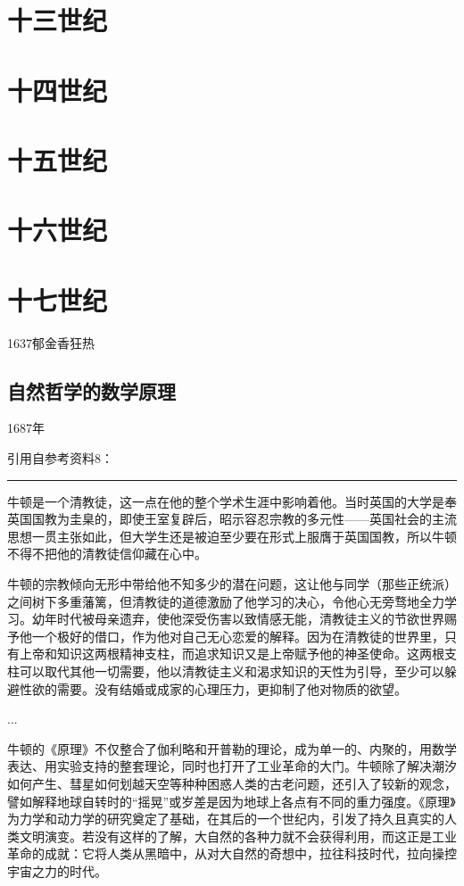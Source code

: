 \documentclass[12pt,oneside]{book}
\newcommand\hr{\par\noindent\hrule}
\begin{document}
\part{十三世纪}

\part{十四世纪}

\part{十五世纪}




\part{十六世纪}

\part{十七世纪}
1637郁金香狂热

\chapter{自然哲学的数学原理}
1687年

引用自参考资料8：
\hr 
牛顿是一个清教徒，这一点在他的整个学术生涯中影响着他。当时英国的大学是奉英国国教为圭臬的，即使王室复辟后，昭示容忍宗教的多元性——英国社会的主流思想一贯主张如此，但大学生还是被迫至少要在形式上服膺于英国国教，所以牛顿不得不把他的清教徒信仰藏在心中。

牛顿的宗教倾向无形中带给他不知多少的潜在问题，这让他与同学（那些正统派）之间树下多重藩篱，但清教徒的道德激励了他学习的决心，令他心无旁骛地全力学习。幼年时代被母亲遗弃，使他深受伤害以致情感无能，清教徒主义的节欲世界赐予他一个极好的借口，作为他对自己无心恋爱的解释。因为在清教徒的世界里，只有上帝和知识这两根精神支柱，而追求知识又是上帝赋予他的神圣使命。这两根支柱可以取代其他一切需要，他以清教徒主义和渴求知识的天性为引导，至少可以躲避性欲的需要。没有结婚或成家的心理压力，更抑制了他对物质的欲望。

...


牛顿的《原理》不仅整合了伽利略和开普勒的理论，成为单一的、内聚的，用数学表达、用实验支持的整套理论，同时也打开了工业革命的大门。牛顿除了解决潮汐如何产生、彗星如何划越天空等种种困惑人类的古老问题，还引入了较新的观念，譬如解释地球自转时的“摇晃”或岁差是因为地球上各点有不同的重力强度。《原理》为力学和动力学的研究奠定了基础，在其后的一个世纪内，引发了持久且真实的人类文明演变。若没有这样的了解，大自然的各种力就不会获得利用，而这正是工业革命的成就：它将人类从黑暗中，从对大自然的奇想中，拉往科技时代，拉向操控宇宙之力的时代。
\end{document}
